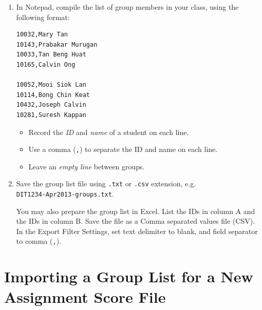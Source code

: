 \documentclass[a4paper,11pt]{refart}
\begin{document}
\begin{enumerate}
\item In Notepad, compile the list of group members in your class, using the following format:

\begin{lstlisting}
10032,Mary Tan
10143,Prabakar Murugan
10033,Tan Beng Huat
10165,Calvin Ong

10052,Mooi Siok Lan
10114,Bong Chin Keat
10432,Joseph Calvin
10281,Suresh Kappan
\end{lstlisting}

  \begin{itemize}[noitemsep]
  \item Record the \emph{ID} and \emph{name} of a student on each line.
  \item Use a comma (\texttt{,}) to separate the ID and name on each line.
  \item Leave an \emph{empty line} between groups.
  \end{itemize}
  
\item Save the group list file using \texttt{.txt} or \texttt{.csv} extension, e.g.\\\texttt{DIT1234-Apr2013-groups.txt}.

\medskip

\begin{leftbar}
You may also prepare the group list in Excel. List the IDs in column A and the IDs in column B. Save the file as a Comma separated values file (CSV). In the Export Filter Settings, set text delimiter to blank, and field separator to comma (\texttt{,}).
\end{leftbar}

\end{enumerate}

\section{Importing a Group List for a New Assignment Score File}
\end{document}
